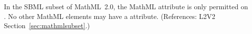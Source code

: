 In the SBML subset of MathML~2.0, the MathML attribute  is
only permitted on .  No other MathML elements may have a
 attribute.  (References: L2V2
Section~\ref{sec:mathmlsubset}.)
